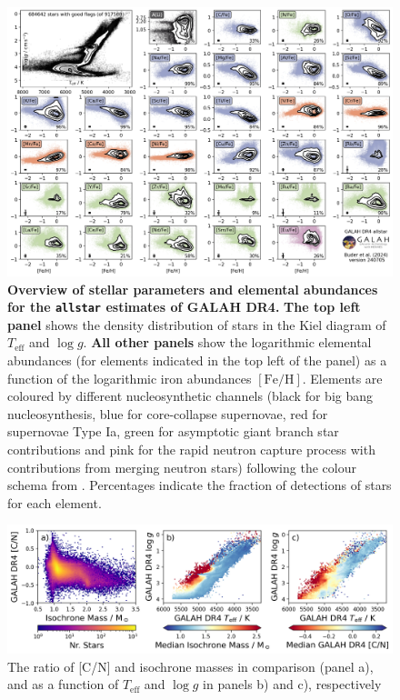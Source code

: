 \documentclass[
  journal=pasa,
  manuscript=research-paper, %
  year=2024,
  volume=37
]{cup-journal}
\newcommand{\Teff}{$T_\mathrm{eff}$\xspace}
\newcommand{\logg}{$\log g$\xspace}
\newcommand{\feh}{$\mathrm{[Fe/H]}$\xspace}
\begin{document}
\begin{landscape}
\begin{figure}[ht]
\includegraphics[width=0.975\columnwidth]{figures/galah_dr4_overview_allstar.png}
\caption{
\textbf{Overview of stellar parameters and elemental abundances for the \texttt{allstar} estimates of GALAH DR4.}
\textbf{The top left panel} shows the density distribution of stars in the Kiel diagram of \Teff and \logg.
\textbf{All other panels} show the logarithmic elemental abundances (for elements indicated in the top left of the panel) as a function of the logarithmic iron abundances \feh. Elements are coloured by different nucleosynthetic channels (black for big bang nucleosynthesis, blue for core-collapse supernovae, red for supernovae Type Ia, green for asymptotic giant branch star contributions and pink for the rapid neutron capture process with contributions from merging neutron stars) following the colour schema from \citet{Kobayashi2020}. Percentages indicate the fraction of detections of stars for each element.
}
\label{fig:galah_dr4_overview_allstar}
\end{figure}
\end{landscape}

\begin{figure}[ht]
    \centering
    \includegraphics[width=\textwidth]{figures/cn_mass.png}
    \caption{The ratio of [C/N] and isochrone masses in comparison (panel a), and as a function of \Teff and \logg in panels b) and c), respectively}
    \label{fig:cn_mass}
\end{figure}
\end{document}
